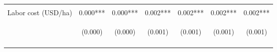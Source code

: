 \begin{center}
\begin{tabular}{lcccccc}
\vspace{4pt} & \begin{footnotesize}[0.004]\end{footnotesize} & \begin{footnotesize}[0.002]\end{footnotesize} & \begin{footnotesize}[0.108]\end{footnotesize} & \begin{footnotesize}[0.054]\end{footnotesize} & \begin{footnotesize}[0.138]\end{footnotesize} & \begin{footnotesize}[0.071]\end{footnotesize} \\
Labor cost (USD/ha) & 0.000*** & 0.000*** & 0.002*** & 0.002*** & 0.002*** & 0.002*** \\
 & \begin{footnotesize}(0.000)\end{footnotesize} & \begin{footnotesize}(0.000)\end{footnotesize} & \begin{footnotesize}(0.001)\end{footnotesize} & \begin{footnotesize}(0.001)\end{footnotesize} & \begin{footnotesize}(0.001)\end{footnotesize} & \begin{footnotesize}(0.001)\end{footnotesize} \\
\vspace{4pt} & \begin{footnotesize}[0.001]\end{footnotesize} & \begin{footnotesize}[0.000]\end{footnotesize} & \begin{footnotesize}[0.004]\end{footnotesize} & \begin{footnotesize}[0.002]\end{footnotesize} & \begin{footnotesize}[0.004]\end{footnotesize} & \begin{footnotesize}[0.003]\end{footnotesize} \\

\end{tabular}
\end{center}
